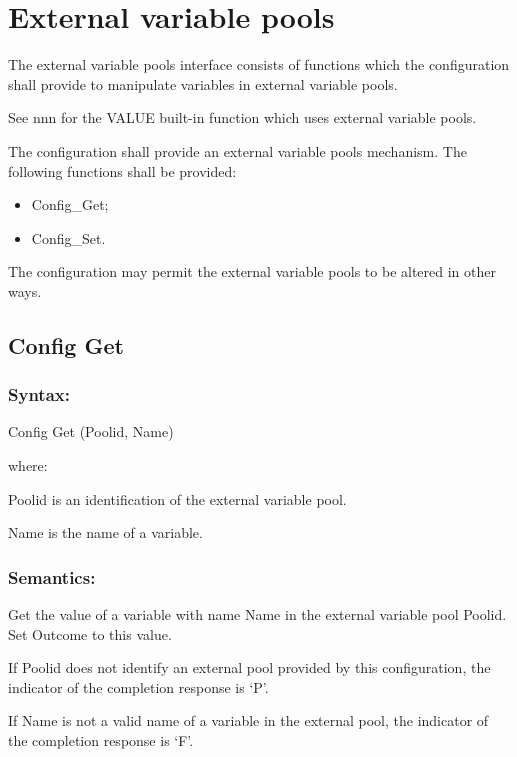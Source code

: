 \section{External variable pools}\label{external-variable-pools}

The external variable pools interface consists of functions which the
configuration shall provide to manipulate variables in external variable
pools.

See nnn for the VALUE built-in function which uses external variable
pools.

The configuration shall provide an external variable pools mechanism.
The following functions shall be provided:

\begin{itemize}
\item
  Config\_Get;
\item
  Config\_Set.
\end{itemize}

The configuration may permit the external variable pools to be altered
in other ways.

\subsection{Config Get}\label{config-get}

\subsubsection{Syntax:}\label{syntax-33}

Config Get (Poolid, Name)

where:

Poolid is an identification of the external variable pool.

Name is the name of a variable.

\subsubsection{Semantics:}\label{semantics-34}

Get the value of a variable with name Name in the external variable pool
Poolid. Set Outcome to this value.

If Poolid does not identify an external pool provided by this
configuration, the indicator of the completion response is `P'.

If Name is not a valid name of a variable in the external pool, the
indicator of the completion response is `F'.

